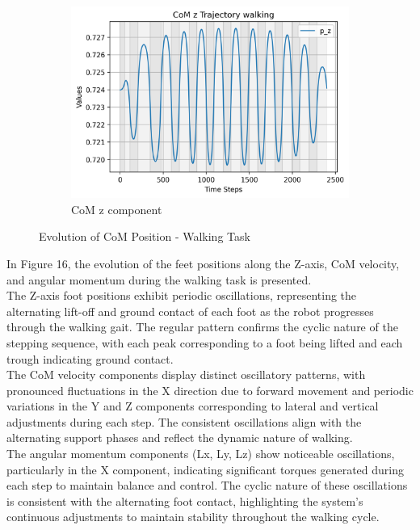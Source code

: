 \documentclass[main.tex]{subfiles}
\begin{document}
\begin{figure}[H]
\begin{subfigure}[b]{0.32\textwidth}
        \includegraphics[width=\textwidth]{figures/CoM z Trajectory walking.png}
        \caption{CoM z component}
        \label{fig:sub3}
    \end{subfigure}
    \caption{Evolution of CoM Position - Walking Task}
    \label{fig:threeimages}
\end{figure}
In Figure 16, the evolution of the feet positions along the Z-axis, CoM velocity, and angular momentum during the walking task is presented.\\
The Z-axis foot positions exhibit periodic oscillations, representing the alternating lift-off and ground contact of each foot as the robot progresses through the walking gait. The regular pattern confirms the cyclic nature of the stepping sequence, with each peak corresponding to a foot being lifted and each trough indicating ground contact.\\
The CoM velocity components display distinct oscillatory patterns, with pronounced fluctuations in the X direction due to forward movement and periodic variations in the Y and Z components corresponding to lateral and vertical adjustments during each step. The consistent oscillations align with the alternating support phases and reflect the dynamic nature of walking.\\
The angular momentum components (Lx, Ly, Lz) show noticeable oscillations, particularly in the X component, indicating significant torques generated during each step to maintain balance and control. The cyclic nature of these oscillations is consistent with the alternating foot contact, highlighting the system’s continuous adjustments to maintain stability throughout the walking cycle.
\end{document}
